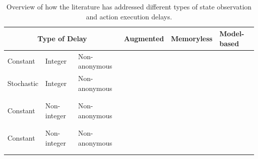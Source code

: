 \begin{table}[t]
\begin{tabular}{lll||>{\raggedright\arraybackslash}p{2.1cm}|>{\raggedright\arraybackslash}p{2.1cm}|>{\raggedright\arraybackslash}p{2.1cm}}

 \multicolumn{3}{c||}{Type of Delay}&  Augmented & Memoryless & Model-based \\
 \hline\hline
Constant & Integer & Non-anonymous&  {\footnotesize\cite{brooks1972markov}\cite{ramstedt2019real}\cite{bouteiller2020reinforcement}} &  {\footnotesize\cite{schuitema2010control}\cite{hester2013texplore}} & {\footnotesize\cite{walsh2009learning}\cite{firoiu2018human}\cite{agarwal2021blind}\cite{derman2021acting} \cite{chen2021delay}}\\
 \hline
Stochastic & Integer & Non-anonymous& {\footnotesize\cite{bouteiller2020reinforcement}} &  & {\footnotesize\cite{agarwal2021blind}}  \\
&&&&&\\
 &&&&&\\
\hline
Constant & Non-integer & Non-anonymous&  & {\footnotesize\cite{schuitema2010control}} &  \\
&&&&&\\
&&&&&\\
 \hline
Constant & Non-integer & Non-anonymous&  &  &  \\
&&&&&\\
&&&&&\\
\end{tabular}
\caption{Overview of how the literature has addressed different types of state observation and action execution delays.}
\label{tab:delay_related}
\end{table}


